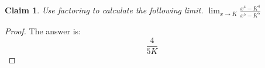 \documentclass{article}
\newtheorem{theorem}{Claim}
\begin{document}
\begin{theorem}
Use factoring to calculate the following limit.
$ \lim_{x \rightarrow K} \frac {{x}^4-K^4} {{x}^5-K^5} $
\end{theorem}

\begin{proof}
The answer is:
\[
\frac{4}{5 K}
\]
\end{proof}
\end{document}
